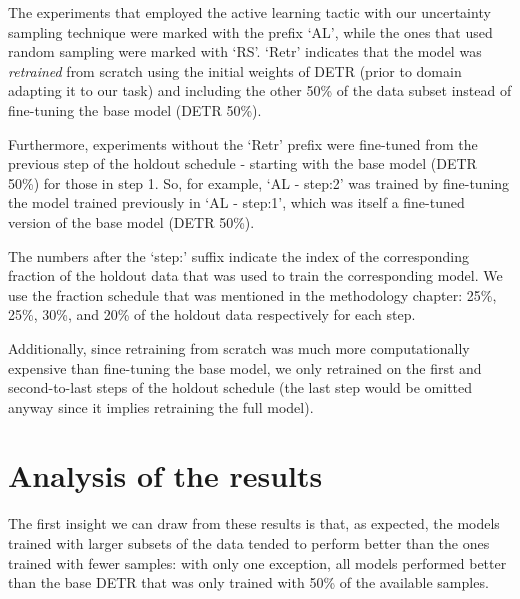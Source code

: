 \documentclass[../main.tex]{subfiles}
\begin{document}
The experiments that employed the active learning tactic with our uncertainty sampling technique were marked with the prefix `AL', while the ones that used random sampling were marked with `RS'. `Retr' indicates that the model was \textit{retrained} from scratch using the initial weights of DETR (prior to domain adapting it to our task) and including the other 50\% of the data subset instead of fine-tuning the base model (DETR 50\%).

Furthermore, experiments without the `Retr' prefix were fine-tuned from the previous step of the holdout schedule - starting with the base model (DETR 50\%) for those in step 1. So, for example, `AL - step:2' was trained by fine-tuning the model trained previously in `AL - step:1', which was itself a fine-tuned version of the base model (DETR 50\%). 

The numbers after the `step:' suffix indicate the index of the corresponding fraction of the holdout data that was used to train the corresponding model. We use the fraction schedule that was mentioned in the methodology chapter: 25\%, 25\%, 30\%, and 20\% of the holdout data respectively for each step.


Additionally, since retraining from scratch was much more computationally expensive than fine-tuning the base model, we only retrained on the first and second-to-last steps of the holdout schedule (the last step would be omitted anyway since it implies retraining the full model).

 

\clearpage

\section{Analysis of the results} \label{results:analysis}

The first insight we can draw from these results is that, as expected, the models trained with larger subsets of the data tended to perform better than the ones trained with fewer samples: with only one exception, all models performed better than the base DETR that was only trained with 50\% of the available samples.
\end{document}
